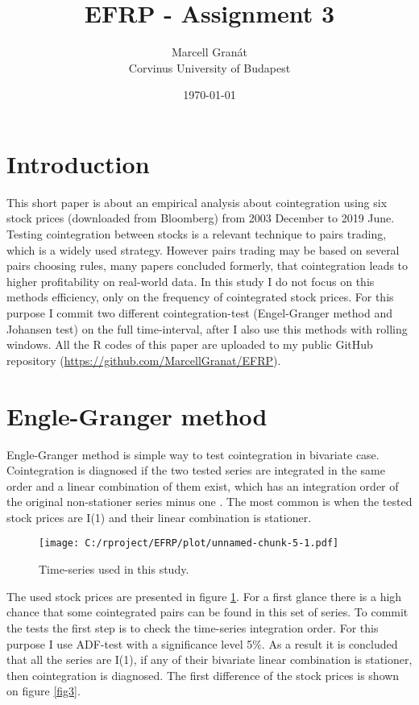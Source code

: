 \documentclass[12pt, a4paper, twoside, titlepage]{article}
\title{EFRP - Assignment 3}
\date{\today}
\author{Marcell Granát \\ Corvinus University of Budapest}
\begin{document}
  \maketitle
  \tableofcontents
  

\section{Introduction}
\setcounter{page}{1}

This short paper is about an empirical analysis about cointegration using six stock prices (downloaded from Bloomberg) from 2003 December to 2019 June. Testing cointegration between stocks is a relevant technique to pairs trading, which is a widely used strategy. However pairs trading may be based on several pairs choosing rules, many papers concluded formerly, that cointegration leads to higher profitability on real-world data\cite{Huck.2014}.
In this study I do not focus on this methods efficiency, only on the frequency of cointegrated stock prices. For this purpose I commit two different cointegration-test (Engel-Granger method and Johansen test) on the full time-interval, after I also use this methods with rolling windows. All the R codes of this paper are uploaded to my public GitHub repository (\href{https://github.com/MarcellGranat/EFRP/blob/master/Exercise-3.md}{https://github.com/MarcellGranat/EFRP}). 

\section{Engle-Granger method}

Engle-Granger method is simple way to test cointegration in bivariate case. Cointegration is diagnosed if the two tested series are integrated in the same order and a linear combination of them exist, which has an integration order of the original non-stationer series minus one \cite{Kirchgassner.2007}.
The most common is when the tested stock prices are I(1) and their linear combination is stationer.

\begin{figure}[ht]
  \centering
  \texttt{[image: C:/rproject/EFRP/plot/unnamed-chunk-5-1.pdf]}
  \caption{Time-series used in this study.}
  \label{fig1}
\end{figure}

The used stock prices are presented in figure \ref{fig1}. For a first glance there is a high chance that some cointegrated pairs can be found in this set of series. To commit the tests the first step is to check the time-series integration order. For this purpose I use ADF-test with a significance level 5\%. As a result it is concluded that all the series are I(1), if any of their bivariate linear combination is stationer, then cointegration is diagnosed. The first difference of the stock prices is shown on figure \ref{fig3}.
\end{document}
